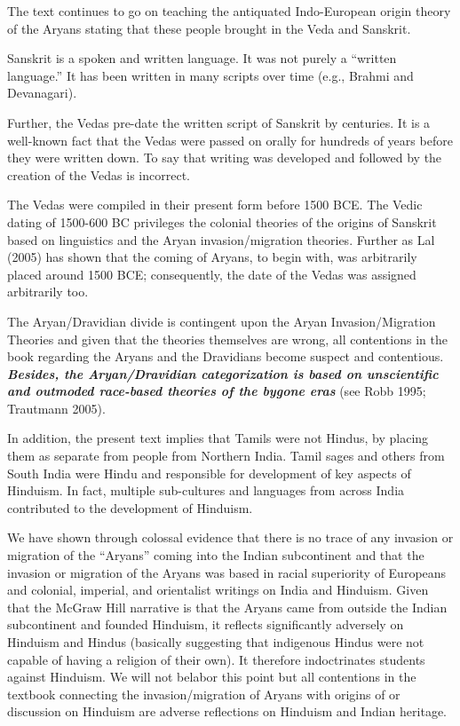 The text continues to go on teaching the antiquated Indo-European origin theory of the Aryans stating that these people brought in the Veda and Sanskrit. 

Sanskrit is a spoken and written language. It was not purely a “written language.” It has been written in many scripts over time (e.g., Brahmi and Devanagari). 

Further, the Vedas pre-date the written script of Sanskrit by centuries. It is a well-known fact that the Vedas were passed on orally for hundreds of years before they were written down. To say that writing was developed and followed by the creation of the Vedas is incorrect.

The Vedas were compiled in their present form before 1500 BCE. The Vedic dating of 1500-600 BC privileges the colonial theories of the origins of Sanskrit based on linguistics and the Aryan invasion/migration theories. Further as Lal (2005) has shown that the coming of Aryans, to begin with, was arbitrarily placed around 1500 BCE; consequently, the date of the Vedas was assigned arbitrarily too.

The Aryan/Dravidian divide is contingent upon the Aryan Invasion/Migration Theories and given that the theories themselves are wrong, all contentions in the book regarding the Aryans and the Dravidians become suspect and contentious. \textit{\textbf{Besides, the Aryan/Dravidian categorization is based on unscientific and outmoded race-based theories of the bygone eras} } (see Robb 1995; Trautmann 2005). 

In addition, the present text implies that Tamils were not Hindus, by placing them as separate from people from Northern India. Tamil sages and others from South India were Hindu and responsible for development of key aspects of Hinduism. In fact, multiple sub-cultures and languages from across India contributed to the development of Hinduism.

We have shown through colossal evidence that there is no trace of any invasion or migration of the “Aryans” coming into the Indian subcontinent and that the invasion or migration of the Aryans was based in racial superiority of Europeans and colonial, imperial, and orientalist writings on India and Hinduism. Given that the McGraw Hill narrative is that the Aryans came from outside the Indian subcontinent and founded Hinduism, it reflects significantly adversely on Hinduism and Hindus (basically suggesting that indigenous Hindus were not capable of having a religion of their own). It therefore indoctrinates students against Hinduism. We will not belabor this point but all contentions in the textbook connecting the invasion/migration of Aryans with origins of or discussion on Hinduism are adverse reflections on Hinduism and Indian heritage.

